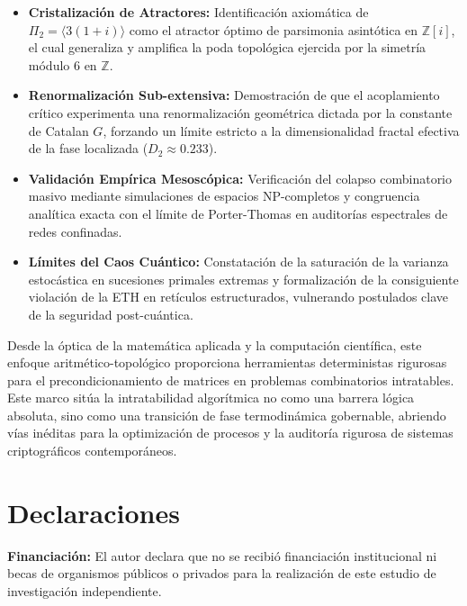 \documentclass[sn-mathphys]{sn-jnl}
\theoremstyle{definition} %
\begin{document}
\begin{itemize}
    \item \textbf{Cristalización de Atractores:} Identificación axiomática de $\Pi_2 = \langle 3(1+i) \rangle$ como el atractor óptimo de parsimonia asintótica en $\mathbb{Z}[i]$, el cual generaliza y amplifica la poda topológica ejercida por la simetría módulo $6$ en $\mathbb{Z}$.
    \item \textbf{Renormalización Sub-extensiva:} Demostración de que el acoplamiento crítico experimenta una renormalización geométrica dictada por la constante de Catalan $G$, forzando un límite estricto a la dimensionalidad fractal efectiva de la fase localizada ($D_2 \approx 0.233$).
    \item \textbf{Validación Empírica Mesoscópica:} Verificación del colapso combinatorio masivo mediante simulaciones de espacios NP-completos y congruencia analítica exacta con el límite de Porter-Thomas en auditorías espectrales de redes confinadas.
    \item \textbf{Límites del Caos Cuántico:} Constatación de la saturación de la varianza estocástica en sucesiones primales extremas y formalización de la consiguiente violación de la ETH en retículos estructurados, vulnerando postulados clave de la seguridad post-cuántica.
\end{itemize}

Desde la óptica de la matemática aplicada y la computación científica, este enfoque aritmético-topológico proporciona herramientas deterministas rigurosas para el precondicionamiento de matrices en problemas combinatorios intratables. Este marco sitúa la intratabilidad algorítmica no como una barrera lógica absoluta, sino como una transición de fase termodinámica gobernable, abriendo vías inéditas para la optimización de procesos y la auditoría rigurosa de sistemas criptográficos contemporáneos.

\section*{Declaraciones}

\textbf{Financiación:} El autor declara que no se recibió financiación institucional ni becas de organismos públicos o privados para la realización de este estudio de investigación independiente.
\end{document}
